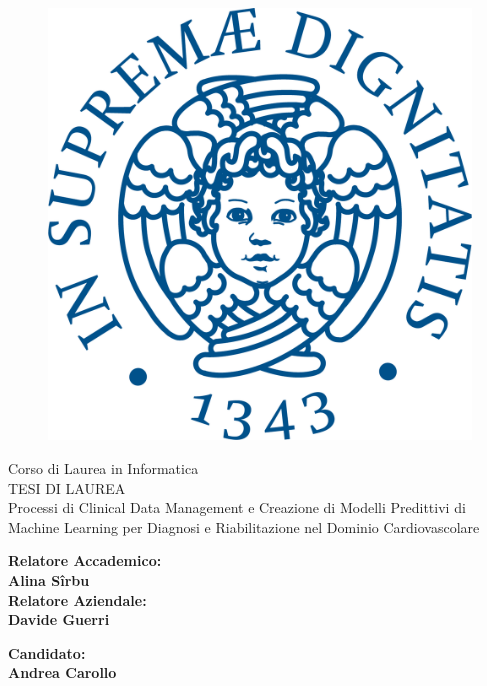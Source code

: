 \documentclass[12pt]{report}
\begin{document}
\begin{titlepage}
\begin{figure}
    \centering\includegraphics[scale=0.5]{immagini/cherubino_pant541.png}
\end{figure}

\begin{center}
    {\LARGE{ Corso di Laurea in Informatica \\}}
    \vspace{2cm}
    {\Large { TESI DI LAUREA }}\\
    \vspace{2cm}
    {\Large {%
    Processi di Clinical Data Management e Creazione di Modelli Predittivi di Machine Learning per Diagnosi e Riabilitazione nel Dominio Cardiovascolare}}
\end{center}

\vspace{2cm}

\begin{minipage}[t]{0.47\textwidth}
	{\large{\bf Relatore Accademico:\\ Alina S\^irbu}}
	\vspace{0.5cm}
	{\large{\bf \\Relatore Aziendale:\\ Davide Guerri}}
\end{minipage}\hfill\begin{minipage}[t]{0.47\textwidth}\raggedleft
	{\large{\bf Candidato: \\ Andrea Carollo\\ }}
\end{minipage}

\vspace{25mm}

\end{titlepage}
\end{document}
